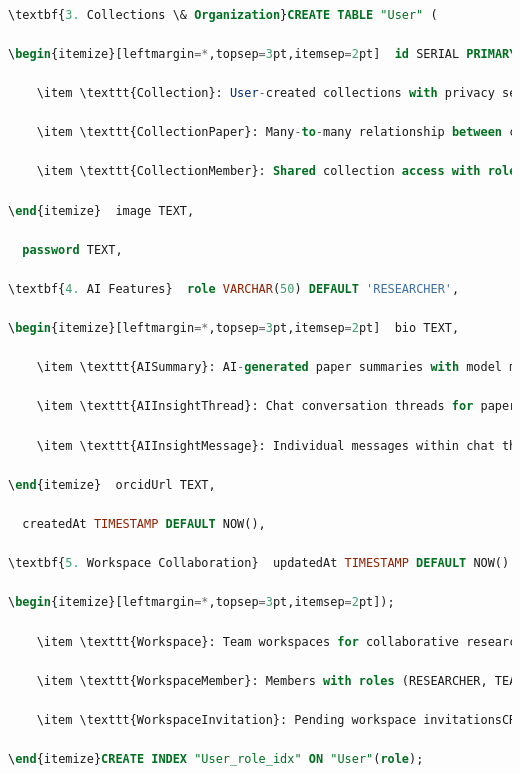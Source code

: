 \begin{lstlisting}[language=SQL, caption={User Table Schema}]

\textbf{3. Collections \& Organization}CREATE TABLE "User" (

\begin{itemize}[leftmargin=*,topsep=3pt,itemsep=2pt]  id SERIAL PRIMARY KEY,

    \item \texttt{Collection}: User-created collections with privacy settings  name VARCHAR(255),

    \item \texttt{CollectionPaper}: Many-to-many relationship between collections and papers  email VARCHAR(255) UNIQUE NOT NULL,

    \item \texttt{CollectionMember}: Shared collection access with role-based permissions  emailVerified TIMESTAMP,

\end{itemize}  image TEXT,

  password TEXT,

\textbf{4. AI Features}  role VARCHAR(50) DEFAULT 'RESEARCHER',

\begin{itemize}[leftmargin=*,topsep=3pt,itemsep=2pt]  bio TEXT,

    \item \texttt{AISummary}: AI-generated paper summaries with model metadata  institution VARCHAR(255),

    \item \texttt{AIInsightThread}: Chat conversation threads for paper discussions  field VARCHAR(255),

    \item \texttt{AIInsightMessage}: Individual messages within chat threads  googleScholarUrl TEXT,

\end{itemize}  orcidUrl TEXT,

  createdAt TIMESTAMP DEFAULT NOW(),

\textbf{5. Workspace Collaboration}  updatedAt TIMESTAMP DEFAULT NOW()

\begin{itemize}[leftmargin=*,topsep=3pt,itemsep=2pt]);

    \item \texttt{Workspace}: Team workspaces for collaborative research

    \item \texttt{WorkspaceMember}: Members with roles (RESEARCHER, TEAM\_LEAD, OWNER)-- Indexes

    \item \texttt{WorkspaceInvitation}: Pending workspace invitationsCREATE UNIQUE INDEX "User_email_key" ON "User"(email);

\end{itemize}CREATE INDEX "User_role_idx" ON "User"(role);

\end{lstlisting}

